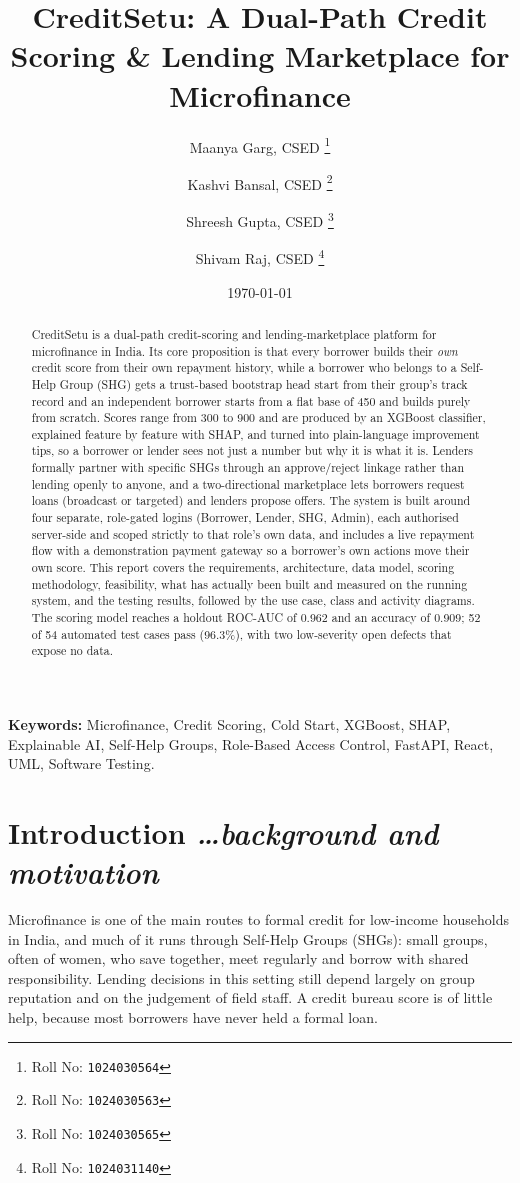 \documentclass[11pt,a4paper]{article}
\title{CreditSetu: A Dual-Path Credit Scoring \& Lending Marketplace for Microfinance}
\author{
  Maanya Garg, CSED%
  \thanks{Roll No: \texttt{1024030564}}
  \and
  Kashvi Bansal, CSED%
  \thanks{Roll No: \texttt{1024030563}}
  \and
  Shreesh Gupta, CSED%
  \thanks{Roll No: \texttt{1024030565}}
  \and
  Shivam Raj, CSED%
  \thanks{Roll No: \texttt{1024031140}}
}
\date{\today}
\newcommand{\BvrHint}[1]{%
  {\normalfont\normalsize\itshape\hfill #1}}
\begin{document}
\maketitle

\begin{abstract}
CreditSetu is a dual-path credit-scoring and lending-marketplace platform
for microfinance in India. Its core proposition is that every borrower
builds their \emph{own} credit score from their own repayment history,
while a borrower who belongs to a Self-Help Group (SHG) gets a trust-based
bootstrap head start from their group's track record and an independent
borrower starts from a flat base of 450 and builds purely from scratch.
Scores range from 300 to 900 and are produced by an XGBoost classifier,
explained feature by feature with SHAP, and turned into plain-language
improvement tips, so a borrower or lender sees not just a number but why it
is what it is. Lenders formally partner with specific SHGs through an
approve/reject linkage rather than lending openly to anyone, and a
two-directional marketplace lets borrowers request loans (broadcast or
targeted) and lenders propose offers. The system is built around four
separate, role-gated logins (Borrower, Lender, SHG, Admin), each authorised
server-side and scoped strictly to that role's own data, and includes a
live repayment flow with a demonstration payment gateway so a borrower's
own actions move their own score. This report covers the requirements,
architecture, data model, scoring methodology, feasibility, what has
actually been built and measured on the running system, and the testing
results, followed by the use case, class and activity diagrams. The scoring
model reaches a holdout ROC-AUC of 0.962 and an accuracy of 0.909; 52 of 54
automated test cases pass (96.3\%), with two low-severity open defects that
expose no data.
\end{abstract}

\textbf{Keywords:} Microfinance, Credit Scoring, Cold Start, XGBoost, SHAP,
Explainable AI, Self-Help Groups, Role-Based Access Control, FastAPI,
React, UML, Software Testing.

\newpage
\tableofcontents
\newpage

\section{Introduction%
\BvrHint{\ldots background and motivation}}

Microfinance is one of the main routes to formal credit for low-income
households in India, and much of it runs through Self-Help Groups (SHGs):
small groups, often of women, who save together, meet regularly and borrow
with shared responsibility. Lending decisions in this setting still depend
largely on group reputation and on the judgement of field staff. A credit
bureau score is of little help, because most borrowers have never held a
formal loan.
\end{document}
